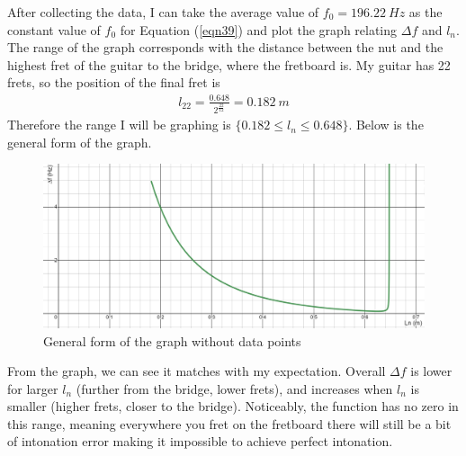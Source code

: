 After collecting the data, I can take the average value of $f_0 = \SI{196.22}{Hz}$ as the constant value of $f_0$ for Equation (\ref{eqn39}) and plot the graph relating $\Delta f$ and $l_n$. The range of the graph corresponds with the distance between the nut and the highest fret of the guitar to the bridge, where the fretboard is. My guitar has 22 frets, so the position of the final fret is
\begin{align*}
    l_{22} = \frac{0.648}{2^{\frac{22}{12}}} = \SI{0.182}{m}
\end{align*} 
Therefore the range I will be graphing is $\{0.182 \le l_n \le 0.648 \}$. Below is the general form of the graph.\par
\FloatBarrier
\begin{figure}[!ht]
    \includegraphics[width = \textwidth]{./ee/no_data_graph.png}
    \caption{General form of the graph without data points} \label{fig7}
\end{figure}
\FloatBarrier
From the graph, we can see it matches with my expectation. Overall $\Delta f$ is lower for larger $l_n$ (further from the bridge, lower frets), and increases when $l_n$ is smaller (higher frets, closer to the bridge). Noticeably, the function has no zero in this range, meaning everywhere you fret on the fretboard there will still be a bit of intonation error making it impossible to achieve perfect intonation.\par
